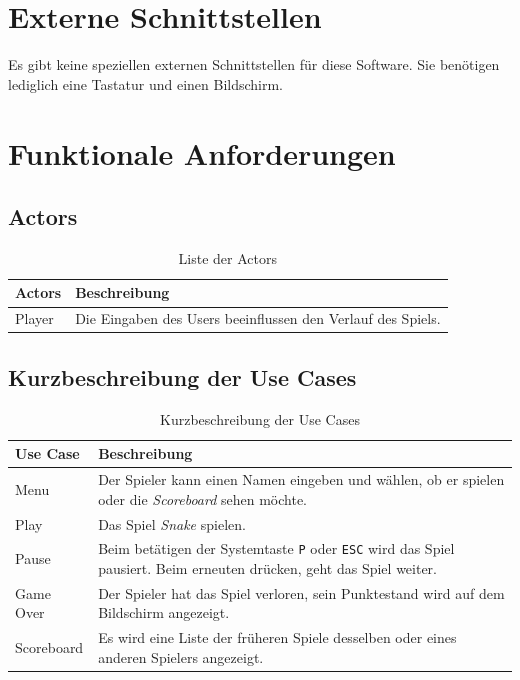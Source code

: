 \documentclass[a4paper, twosided, 11pt]{scrartcl}
\begin{document}
\section{Externe Schnittstellen}
Es gibt keine speziellen externen Schnittstellen für diese Software. Sie
benötigen lediglich eine Tastatur und einen Bildschirm. 

\section{Funktionale Anforderungen}

\subsection{Actors}
\begin{table}[H]
  \centering
  \begin{tabular}{ll}
    \toprule
    Actors & Beschreibung \\
    \midrule
    Player & Die Eingaben des Users beeinflussen den Verlauf des Spiels. \\
    \bottomrule
  \end{tabular}
  \caption{Liste der Actors}
\end{table}

\subsection{Kurzbeschreibung der Use Cases}
\begin{table}[H]
  \centering
  \begin{tabular}{lp{.75\linewidth}}
    \toprule
    Use Case & Beschreibung \\
    \midrule

    Menu & Der Spieler kann einen Namen eingeben und wählen, ob er spielen oder
    die \emph{Scoreboard} sehen möchte. \\

    Play & Das Spiel \emph{Snake} spielen. \\

    Pause & Beim betätigen der Systemtaste \texttt{P} oder \texttt{ESC} wird
    das Spiel pausiert. Beim erneuten drücken, geht das Spiel weiter. \\

    Game Over & Der Spieler hat das Spiel verloren, sein Punktestand wird auf
    dem Bildschirm angezeigt. \\

    Scoreboard & Es wird eine Liste der früheren Spiele desselben oder eines
    anderen Spielers angezeigt. \\

    \bottomrule
  \end{tabular}
  \caption{Kurzbeschreibung der Use Cases}
\end{table}
\end{document}
